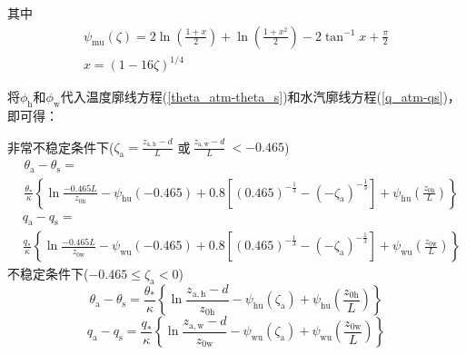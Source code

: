 \noindent 其中
\begin{equation}\label{Psim}
  \begin{array}{c}\psi_{\mathrm{mu}}\left(\zeta\right)=2\ln{(\frac{1+x}{2})}+\ln{\left(\frac{1+x^2}{2}\right)-2}\tan^{-1}{x}+\frac{\pi}{2} \\
  x={(1-16\zeta)}^{1/4}\end{array}
\end{equation}

将$\phi_{\mathrm h}$和$\phi_{\mathrm w}$代入温度廓线方程(\ref{theta_atm-theta_s})和水汽廓线方程(\ref{q_atm-qs})，即可得：

\noindent 非常不稳定条件下($\zeta_{\mathrm{a}}=\frac{z_{\mathrm{a,h}}-d}{L}$ 或$ \ \frac{z_{\mathrm{a,w}}-d}{L}\ <-0.465$)
\begin{equation}\label{theta_VU}
  \begin{aligned}
    &\theta_{\mathrm{a}}-\theta_{\mathrm{s}}= \\
    &\frac{\theta_{*}}{\kappa}\left\{\ln \frac{-0.465 L}{z_{\mathrm{0 h}}}-\psi_{\mathrm{hu}}(-0.465)+0.8\left[(0.465)^{-\frac{1}{3}}-\left(-\zeta_{\mathrm{a}}\right)^{-\frac{1}{3}}\right]
    +\psi_{\mathrm{hu}}\left(\frac{z_{\mathrm{0 h}}}{L}\right)\right\}
  \end{aligned}
\end{equation}
\begin{equation}\label{q_VU}
  \begin{aligned}
    &q_{\mathrm{a}}-q_{\mathrm{s}}= \\
    &\frac{q_{*}}{\kappa}\left\{\ln \frac{-0.465 L}{z_{\mathrm{0 w}}}-\psi_{\mathrm{wu}}(-0.465)+0.8\left[(0.465)^{-\frac{1}{3}}-
    \left(-\zeta_{\mathrm{a}}\right)^{-\frac{1}{3}}\right]+\psi_{\mathrm{wu}}\left(\frac{z_{\mathrm{0 w}}}{L}\right)\right\}
  \end{aligned}
\end{equation}
不稳定条件下($-0.465\leqslant\zeta_{\mathrm{a}}<0$)
\begin{equation}
  \theta_{\mathrm{a}}-\theta_{\mathrm{s}}=\frac{\theta_{*}}{\kappa}\left\{\ln \frac{z_{\mathrm{a, h}}-d}{z_{\mathrm{0 h}}}-\psi_{\mathrm{hu}}
  \left(\zeta_{\mathrm{a}}\right)+\psi_{\mathrm{hu}}\left(\frac{z_{\mathrm{0 h}}}{L}\right)\right\}
\end{equation}
\begin{equation}
  q_{\mathrm{a}}-q_{\mathrm{s}}=\frac{q_{*}}{\kappa}\left\{\ln \frac{z_{\mathrm{a, w}}-d}{z_{\mathrm{0 w}}}-
  \psi_{\mathrm{wu}}\left(\zeta_{\mathrm{a}}\right)+\psi_{\mathrm{wu}}\left(\frac{z_{\mathrm{0 w}}}{L}\right)\right\}
\end{equation}
